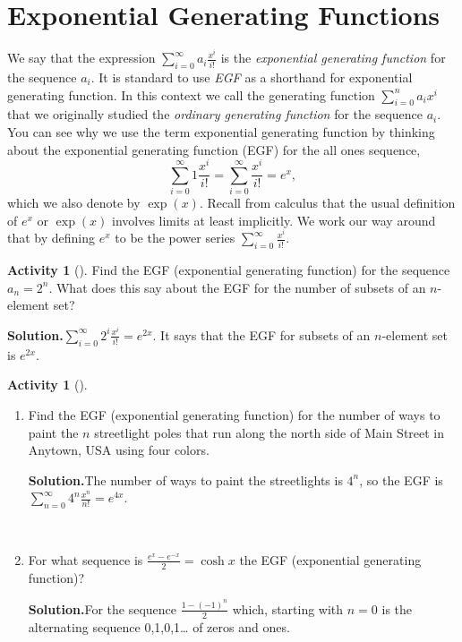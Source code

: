 \documentclass[10pt,]{book}
\theoremstyle{plain}
\theoremstyle{definition}
\newtheorem{activity}[project]{Activity}
\numberwithin{equation}{chapter}
\begin{document}
\section[{Exponential Generating Functions}]{Exponential Generating Functions}\label{section-25}
We say that the expression \(\sum_{i=0}^\infty a_i\frac{x^i}{i!}\) is the \emph{exponential generating function} for the sequence \(a_i\). It is standard to use \emph{EGF} as a shorthand for exponential generating function. In this context we call the generating function \(\sum_{i=0}^n a_ix^i\) that we originally studied the \emph{ordinary generating function} for the sequence \(a_i\). You can see why we use the term exponential generating function by thinking about the exponential generating function (EGF) for the all ones sequence,%
\begin{equation*}
\sum_{i=0}^\infty 1\frac{x^i}{i!} = \sum_{i=0}^\infty \frac{x^i}{i!}
=e^x,
\end{equation*}
which we also denote by \(\exp (x)\). Recall from calculus that the usual definition of \(e^x\) or \(\exp(x)\) involves limits at least implicitly. We work our way around that by defining \(e^x\) to be the power series \(\sum_{i=0}^\infty
\frac{x^i}{i!}\).%
\begin{activity}[]\label{activity-337}
Find the EGF (exponential generating function) for the sequence \(a_n=2^n\). What does this say about the EGF for the number of subsets of an \(n\)-element set?%
\par\medskip\noindent%
\textbf{Solution.}\quad \(\sum_{i=0}^\infty {2^i}\frac{x^i}{i!}=e^{2x}\). It says that the EGF for subsets of an \(n\)-element set is \(e^{2x}\).%
\end{activity}
\begin{activity}[]\label{paintinglightpoles}
~\par
\begin{enumerate}[label=(\alph*)]
 \item Find the EGF (exponential generating function) for the number of ways to paint the \(n\) streetlight poles that run along the north side of Main Street in Anytown, USA using four colors.%
\par\medskip\noindent%
\textbf{Solution.}\quad The number of ways to paint the streetlights is \(4^n\), so the EGF is \(\sum_{n=0}^\infty 4^n\frac{x^n}{n!}=e^{4x}\).%

~\par
\item For what sequence is \(\frac{e^x-e^{-x}}{2} =\cosh x\) the EGF (exponential generating function)?%
\par\medskip\noindent%
\textbf{Solution.}\quad For the sequence \(\frac{1-(-1)^n}{2}\) which, starting with \(n=0\) is the alternating sequence 0,1,0,1\dots{} of zeros and ones.%

\end{enumerate}
\end{activity}
\end{document}
